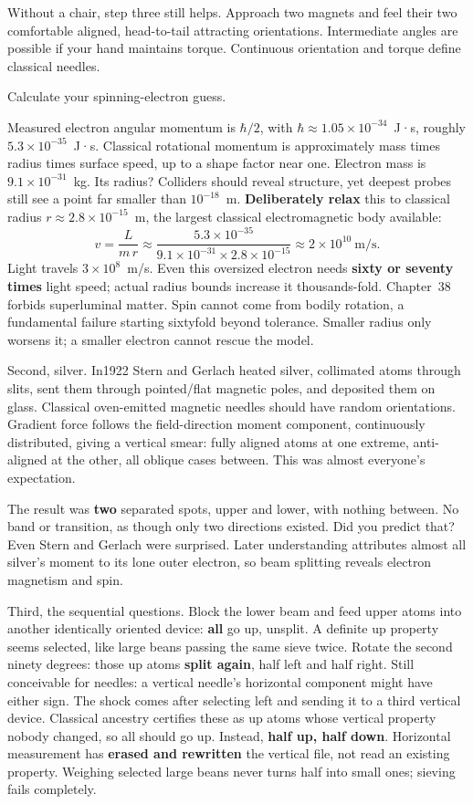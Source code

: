 Without a chair, step three still helps. Approach two magnets and feel their two comfortable aligned, head-to-tail attracting orientations. Intermediate angles are possible if your hand maintains torque. Continuous orientation and torque define classical needles.


Calculate your spinning-electron guess.

Measured electron angular momentum is $\hbar/2$, with $\hbar\approx1.05\times10^{-34}$~J·s, roughly $5.3\times10^{-35}$~J·s. Classical rotational momentum is approximately mass times radius times surface speed, up to a shape factor near one. Electron mass is $9.1\times10^{-31}$~kg. Its radius? Colliders should reveal structure, yet deepest probes still see a point far smaller than $10^{-18}$~m. \textbf{Deliberately relax} this to classical radius $r\approx2.8\times10^{-15}$~m, the largest classical electromagnetic body available:
\[
v=\frac{L}{m\,r}\approx\frac{5.3\times10^{-35}}{9.1\times10^{-31}\times2.8\times10^{-15}}
\approx2\times10^{10}\ \text{m/s}.
\]
Light travels $3\times10^{8}$~m/s. Even this oversized electron needs \textbf{sixty or seventy times} light speed; actual radius bounds increase it thousands-fold. Chapter~38 forbids superluminal matter. Spin cannot come from bodily rotation, a fundamental failure starting sixtyfold beyond tolerance. Smaller radius only worsens it; a smaller electron cannot rescue the model.

Second, silver. In1922 Stern and Gerlach heated silver, collimated atoms through slits, sent them through pointed/flat magnetic poles, and deposited them on glass. Classical oven-emitted magnetic needles should have random orientations. Gradient force follows the field-direction moment component, continuously distributed, giving a vertical smear: fully aligned atoms at one extreme, anti-aligned at the other, all oblique cases between. This was almost everyone's expectation.

The result was \textbf{two} separated spots, upper and lower, with nothing between. No band or transition, as though only two directions existed. Did you predict that? Even Stern and Gerlach were surprised. Later understanding attributes almost all silver's moment to its lone outer electron, so beam splitting reveals electron magnetism and spin.

Third, the sequential questions. Block the lower beam and feed upper atoms into another identically oriented device: \textbf{all} go up, unsplit. A definite up property seems selected, like large beans passing the same sieve twice. Rotate the second ninety degrees: those up atoms \textbf{split again}, half left and half right. Still conceivable for needles: a vertical needle's horizontal component might have either sign. The shock comes after selecting left and sending it to a third vertical device. Classical ancestry certifies these as up atoms whose vertical property nobody changed, so all should go up. Instead, \textbf{half up, half down}. Horizontal measurement has \textbf{erased and rewritten} the vertical file, not read an existing property. Weighing selected large beans never turns half into small ones; sieving fails completely.

